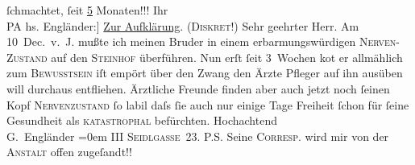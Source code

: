 \begin{ledgroupsized}[t]{13cm}
                  ſchmachtet, ſeit \uline{5} Monaten!!!\pend
           \pstart
           Ihr{\\}\spacefill\mbox{PA}\pend
           \pstart
           \noindent{}{\pb}{[}hs. Engländer:{]} \uline{Zur Aufklärung}. \textsc{(Diskret!)}\pend
           \pstart{}Sehr geehrter Herr.\pend\pstart
           Am 10 Dec. v. J. mußte ich meinen Bruder in einem erbarmungswürdigen \textsc{Nerven-Zustand} auf den \textsc{Steinhof} überführen.\pend
           \pstart
           Nun erſt ſeit 3 {\pb}Wochen ko{\geminationm}t er allmählich zum \textsc{Bewusstsein}{ }{\kaufmannsund} iſt empört über den Zwang den Ärzte{ }{\kaufmannsund} Pfleger auf ihn ausüben {\kaufmannsund}
               will durchaus entfliehen. Ärztliche {\pb}Freunde finden aber auch jetzt noch ſeinen Kopf {\kaufmannsund}{ }\textsc{Nervenzustand} ſo labil daſs ſie auch nur einige Tage
               Freiheit ſchon für ſeine Gesundheit als \textsc{katastrophal}
               befürchten.\pend
           \pstart
           Hochachtend{\\[\baselineskip]}\spacefill\mbox{G. Engländer}\pend
           \leftskip=0em{}\pstart
           \noindent{}III \textsc{Seidlgasse} 23.\pend
           \pstart
           P.S. Seine \textsc{Correſp}. wird mir von der \textsc{Anstalt} offen zugeſandt!!\pend
           
         
         \endnumbering{}\end{ledgroupsized}  \newcommand{\dateiname}{L02120}\newcommand{\titel}{Peter Altenberg und Georg Engländer an Arthur Schnitzler, [Mitte April] 1913}\newcommand{\editorInnen}{Martin Anton Müller und Gerd-Hermann Susen}
      